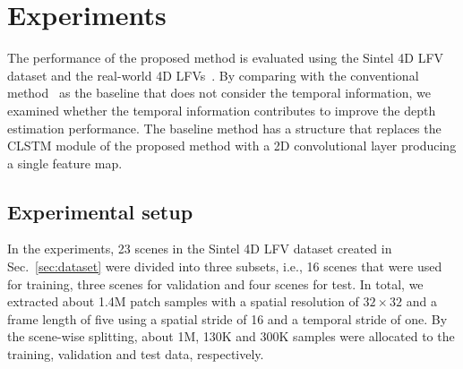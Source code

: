 \documentclass[]{spie}
\newcommand{\jtextd}[1]{}
\begin{document}
\section{Experiments}
\jtextd{
   提案手法の有効性を検証するために，作成したSintel 4D LFVsデータセットお
   よび実撮影4D LFVsを用いて実験を行った．
奥行き推定に時間情報を考慮しない従来手法~\cite{faluvegi20193d}と比較す
  ることで，時系列情報の利用が奥行き推定の精度向上に寄与するかどうかを検
  討した．
}
The performance of the proposed method is 
evaluated using the Sintel 4D LFV dataset
and the real-world 4D LFVs~\cite{wang2017light}.
By comparing with the conventional method~\cite{faluvegi20193d} as the
baseline that does not consider the temporal information, we examined
whether the temporal information contributes to improve the depth
estimation performance.
The baseline method has a structure that replaces the CLSTM module of
the proposed method with a 2D convolutional layer producing a single
feature map.



\subsection{Experimental setup}
\jtextd{
  本実験ではSec.~\ref{sec:dataset}で作成したSintel 4D LFVsデータセットに
  含まれる23シーンを学習用16シーン，検証用3シーン，テスト用4シーンに分割して使用した．
  また，パッチによる学習を行うために，空間分解能が$32 \times 32$，
  フレーム数が5になるように，16の空間ストライド，1の時間ストライドを使用して
  約1.4M個のパッチサンプルを作成した．
  シーン単位の分割により，約1Mサンプルを学習データに割り当て，
  検証データとテストデータにはそれぞれ約130Kサンプル，約300Kサンプルを割り当てた．
}

In the experiments, 23 scenes in the Sintel 4D LFV dataset 
created in Sec.~\ref{sec:dataset} 
were divided into three subsets, i.e., 16 scenes that were used for training, 
three scenes for validation and four scenes for test.
In total, we extracted about 1.4M patch samples with a spatial
resolution of $32 \times 32$ and a frame length of five using a
spatial stride of 16 and a temporal stride of one.
By the scene-wise splitting, about 1M, 130K and 300K samples were
allocated to the training, validation and test data, respectively.


\jtextd{
  提案手法は，ネットワーク全体を包括的に訓練することが可能であり，
  本実験ではepochの上限を20とした．
Adam optimizer~\cite{kingma2014adam}を用い，バッチサイズを64に設定した．
  初期学習率を0.0005に設定し，10，15epochで0.1倍ずつ減少させることとした．
  また，損失関数の重み付け係数$\lambda$，$\mu$は$\lambda=1$，$\mu=1$に設定した．
  提案手法はTensorFlowをバックエンドとするKerasを使用して実装し，
  学習は1枚のNVIDIA GTX 1080Tiを搭載した計算機上で約4日を要した．
}
\end{document}
